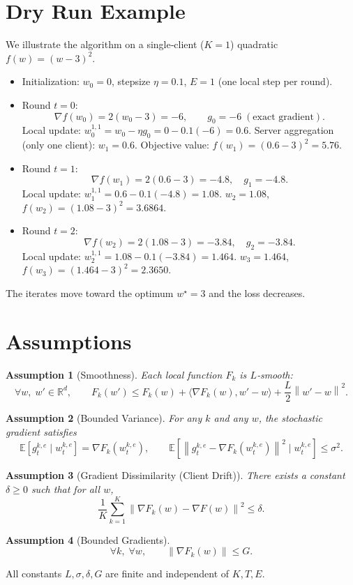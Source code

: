 \documentclass{article}
\newtheorem{assumption}{Assumption}
\newcommand{\E}{\mathbb{E}}
\newcommand{\norm}[1]{\left\|#1\right\|}
\newcommand{\iprod}[2]{\langle #1,#2\rangle}
\newcommand{\R}{\mathbb{R}}
\begin{document}
\section*{Dry Run Example}
We illustrate the algorithm on a single‐client ($K=1$) quadratic 
$f(w)=(w-3)^2$.
\begin{itemize}
\item Initialization: $w_0=0$, stepsize $\eta=0.1$, $E=1$ (one local step per round).
\item Round $t=0$:
    \[
    \nabla f(w_0)=2(w_0-3)=-6,\qquad 
    g_0=-6\;(\text{exact gradient}).
    \]
    Local update: $w_{0}^{1,1}=w_0-\eta g_0=0-0.1(-6)=0.6$.
    Server aggregation (only one client): $w_1=0.6$.
    Objective value: $f(w_1)=(0.6-3)^2=5.76$.
\item Round $t=1$:
    \[
    \nabla f(w_1)=2(0.6-3)=-4.8,\quad g_1=-4.8.
    \]
    Local update: $w_{1}^{1,1}=0.6-0.1(-4.8)=1.08$.
    $w_2=1.08$, $f(w_2)=(1.08-3)^2=3.6864$.
\item Round $t=2$:
    \[
    \nabla f(w_2)=2(1.08-3)=-3.84,\quad g_2=-3.84.
    \]
    Local update: $w_{2}^{1,1}=1.08-0.1(-3.84)=1.464$.
    $w_3=1.464$, $f(w_3)=(1.464-3)^2=2.3650$.
\end{itemize}
The iterates move toward the optimum $w^\star=3$ and the loss decreases.

\newpage
\section*{Assumptions}
\begin{assumption}[Smoothness]\label{ass:smooth}
Each local function $F_k$ is $L$‑smooth:
\[
\forall w,\;w'\in\R^d,\qquad
F_k(w')\le F_k(w)+\iprod{\nabla F_k(w)}{w'-w}+\frac{L}{2}\norm{w'-w}^2 .
\]
\end{assumption}
\begin{assumption}[Bounded Variance]\label{ass:var}
For any $k$ and any $w$, the stochastic gradient satisfies
\[
\E\!\left[ g_{t}^{k,e}\mid w_{t}^{k,e}\right]=\nabla F_k(w_{t}^{k,e}),\qquad
\E\!\left[\norm{g_{t}^{k,e}-\nabla F_k(w_{t}^{k,e})}^2\mid w_{t}^{k,e}\right]\le\sigma^2 .
\]
\end{assumption}
\begin{assumption}[Gradient Dissimilarity (Client Drift)]\label{ass:drift}
There exists a constant $\delta\ge0$ such that for all $w$,
\[
\frac{1}{K}\sum_{k=1}^{K}\norm{\nabla F_k(w)-\nabla F(w)}^2\le\delta .
\]
\end{assumption}
\begin{assumption}[Bounded Gradients]\label{ass:bound}
\[
\forall k,\; \forall w,\qquad \norm{\nabla F_k(w)}\le G .
\]
\end{assumption}
All constants $L,\sigma,\delta,G$ are finite and independent of $K,T,E$.
\end{document}
